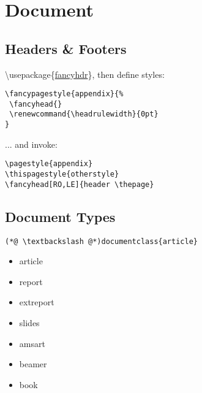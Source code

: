\section{Document}

\subsection*{Headers \& Footers}



\begin{minipage}{6.5cm}
\textbackslash usepackage\{\href{http://mirrors.ctan.org/macros/latex/contrib/fancyhdr/fancyhdr.pdf}{fancyhdr}\}, then define styles: \\
\begin{lstlisting}
\fancypagestyle{appendix}{%
 \fancyhead{}
 \renewcommand{\headrulewidth}{0pt}
}
\end{lstlisting}
... and invoke: \\
\begin{lstlisting}
\pagestyle{appendix}
\thispagestyle{otherstyle}
\fancyhead[RO,LE]{header \thepage}
\end{lstlisting}
\end{minipage}


\subsection*{Document Types}

\begin{code}{6}
\begin{lstlisting}
(*@ \textbackslash @*)documentclass{article}
\end{lstlisting}
\end{code}

\begin{multicols}{3}
\begin{itemize}
    \item article 
    \item report 
    \item extreport 
    \item slides
    \item amsart 
    \item beamer
    \item book 
\end{itemize}
\end{multicols}


